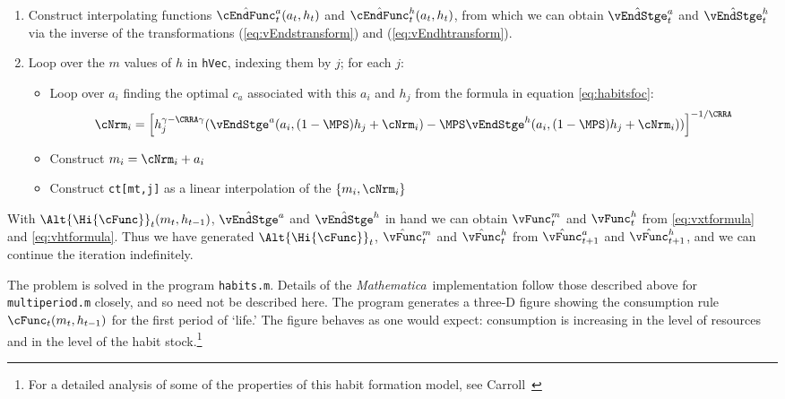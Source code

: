 \documentclass[titlepage, headings=optiontotocandhead]{\econtex}
\newcommand{\Mma}{\textit{Mathematica}}
\begin{document}
{\begin{enumerate}
  \item Construct interpolating functions $\hat{\cEndFunc}^{a}_{t}({a}_{t},h_{t})$
    and $\hat{\cEndFunc}^{h}_{t}({a}_{t},h_{t})$, from which we can
    obtain $\hat{\vEndStge}^{a}_{t}$ and $\hat{\vEndStge}^{h}_{t}$
    via the inverse of the transformations (\ref{eq:vEndstransform})
    and (\ref{eq:vEndhtransform}).

  \item Loop over the $m$ values of $h$ in \texttt{hVec}, indexing them
    by $j$; for each $j$:
    \begin{itemize}
    \item Loop over ${a}_{i}$ finding the optimal ${c}_{a}$ associated
      with this ${a}_{i}$ and $h_{j}$ from the formula in equation
      \eqref{eq:habitsfoc}:
      \begin{equation}
        {\cNrm}_{i} = \left[h_{j}^{\gamma-\CRRA \gamma}
          (\vEndStge^{{a}}({a}_{i},(1-\MPS) h_{j}+ {\cNrm}_{i})
          -\MPS \vEndStge^{h}({a}_{i},(1-\MPS)
          h_{j}+{\cNrm}_{i}))\right]^{-1/\CRRA} \nonumber
      \end{equation}

    \item Construct ${m}_{i} = {\cNrm}_{i}+{a}_{i}$

    \item Construct \texttt{ct[mt,j]} as a linear interpolation of the
      $\{{m}_{i},{\cNrm}_{i}\}$
    \end{itemize}
  \end{enumerate}

  With $\Alt{\Hi{\cFunc}}_{t}({m}_{t},h_{t-1})$, $\hat{\vEndStge}^{{a}}$
  and $\hat{\vEndStge}^{h}$ in hand we can obtain ${\vFunc}^{m}_{t}$
  and ${\vFunc}^{h}_{t}$ from \eqref{eq:vxtformula} and
  \eqref{eq:vhtformula}. Thus we have generated $\Alt{\Hi{\cFunc}}_{t}$,
  $\hat{\vFunc}^{m}_{t}$ and $\hat{\vFunc}^{h}_{t}$ from $\hat{\vFunc}^{a}_{t+1}$ and
  $\hat{\vFunc}^{h}_{t+1}$, and we can continue the iteration indefinitely.

  The problem is solved in the program \texttt{habits.m}.  Details of
  the {\Mma}~implementation follow those described above for
  \texttt{multiperiod.m} closely, and so need not be described here.
  The program generates a three-D figure showing the consumption rule
  $\cFunc_{t}({m}_{t},h_{t-1})$ for the first period of `life.'  The figure
  behaves as one would expect: consumption is increasing in the level
  of resources and in the level of the habit stock.\footnote{For a
    detailed analysis of some of the properties of this habit formation
    model, see Carroll~\citeyearpar{carroll:RiskyHabits}}


}{}
\end{document}
